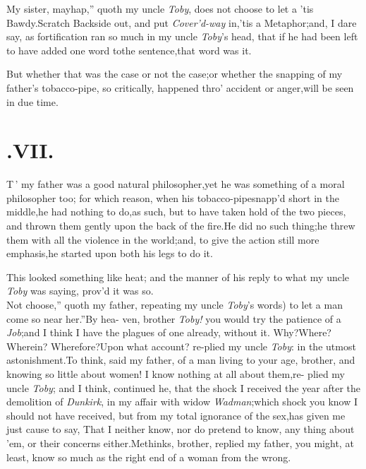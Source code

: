 \documentclass{article}
\begin{document}
\tsh \lqq My sister, mayhap,” quoth my uncle \textit{Toby},
\lqq does not choose to let a
’tis Bawdy.\tsk Scratch Backside out, and put
\textit{Cover’d-way} in,\tsk ’tis a Metaphor;\tsk\break and, I dare say, as
fortification ran so much in my uncle \textit{Toby}’s head, that if he had
been left to have added one word to\break the sentence,\tsh that word was
it.


But whether that was the case or not the case;\tsk or whether
the snapping of my father’s tobacco-pipe, so critically,
happened thro’ accident or anger,\tsk will be seen in due time.\\
\newpage
\section{.\enspace  VII.}

\lettrine{T}{\,}’ my father was a good natural
philosopher,\tsk yet he was something of a moral philosopher
too; for which reason, when his tobacco-pipe\break snapp’d short
in the middle,\tsk he had nothing to do,\tsk as such,\tsk
but to have taken hold of the two pieces, and thrown them
gently upon the back of the fire.\tsh\break He did no such
thing;\tsh he threw them with all the violence in the
world;\tsk and, to give the action still more
emphasis,\tsk\break he started upon both his legs to\break
do it.

This looked something like heat;\tsh\break
and the manner of his reply to what\break
my uncle \textit{Toby} was saying, prov’d it\break
was so.\\
\newpage
\tsh \lqq Not choose,” quoth my father,
repeating my uncle \textit{Toby}’s words) \lqq to let\break
\lqq a man come so near her.”\tsh By hea-\break
ven, brother \textit{Toby!} you would try the patience of a
\textit{Job};\tsk and I think I have the plagues of one
already, without it.\break
\tsh Why?\tsh Where?\tsh Wherein?\tsh\break
Wherefore?\tsh Upon what account? re-\break plied my uncle \textit{Toby}: in the utmost
astonishment.\tsk To think, said my father, of a man living to
your age, brother, and knowing so little about
women!\tsh\break
I know nothing at all about them,\tsk re-\break
plied
my uncle \textit{Toby}; and I think, continued he, that the shock I
received the year after the demolition of \textit{Dunkirk}, in my
affair with widow \textit{Wadman};\tsk which shock you know I
should not have received, but from my total ignorance of the
sex,\tsk has given me just cause to say, That I neither
know, nor do pretend to
know, any thing about ’em, or their concerns either.\tsh Methinks, brother,
replied my father, you might, at least, know so much as the right
end of a woman from the wrong.
\end{document}
